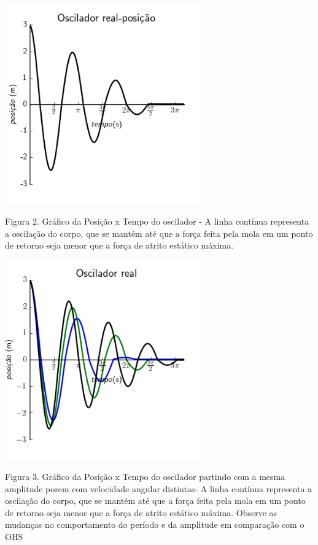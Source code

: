 \documentclass[a4paper]{article} %
\begin{document}
\begin{center}
	\includegraphics[width=3.38in,height=3.38in,keepaspectratio = false]{image1_1.png}
	
	\scriptsize Figura 2. Gr\'afico da Posi\c{c}\~ao x Tempo do oscilador - A linha cont\'inua representa a oscila\c{c}\~ao do corpo, que se mant\'em at\'e que a for\c{c}a feita pela mola em um ponto de retorno seja menor que a for\c{c}a de atrito est\'atico m\'axima.
	
\end{center}

\begin{center}
	\includegraphics[width=3.38in,height=3.38in,keepaspectratio = false]{image_c1.png}
	
	\scriptsize Figura 3. Gr\'afico da Posi\c{c}\~ao x Tempo do oscilador partindo com a mesma amplitude porem com velocidade angular distintas- A linha cont\'inua representa a oscila\c{c}\~ao do corpo, que se mant\'em at\'e que a for\c{c}a feita pela mola em um ponto de retorno seja menor que a for\c{c}a de atrito est\'atico m\'axima. Observe as mudan\c{c}as no comportamento do per\'iodo e da amplitude em compara\c{c}\~ao com o OHS
	
\end{center}
\end{document}
